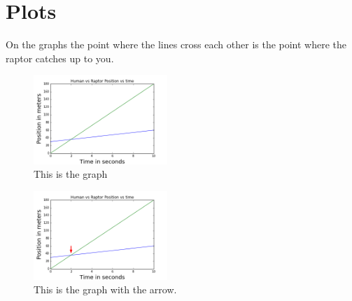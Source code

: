 \documentclass[twocolumn]{revtex4}
\begin{document}
\section{Plots}
On the graphs the point where the lines cross each other is the point where the raptor catches up to you.
\begin{figure}[h]
	\centering
	\includegraphics[width=0.45\textwidth]{RaptorVHuman.png}
	\caption{This is the graph \label{fig:Graph}}
\end{figure}

\begin{figure}[h]
	\centering
	\includegraphics[width=0.45\textwidth]{Arrow.png}
	\caption{This is the graph with the arrow. \label{fig:Graph}}
\end{figure}


\end{document}
